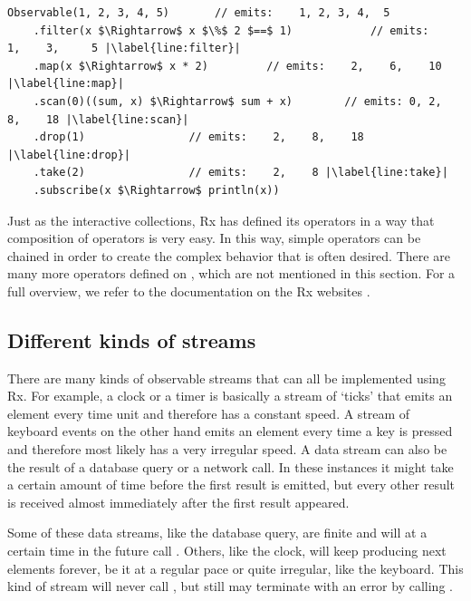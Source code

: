 \begin{minipage}{\linewidth}
\begin{lstlisting}[style=ScalaStyle, caption={Operators on \obs}, label={lst:operators-obs}, columns=fixed]
Observable(1, 2, 3, 4, 5)		// emits:    1, 2, 3, 4,  5
    .filter(x $\Rightarrow$ x $\%$ 2 $==$ 1)			// emits:    1,    3,     5 |\label{line:filter}|
    .map(x $\Rightarrow$ x * 2)			// emits:    2,    6,    10 |\label{line:map}|
    .scan(0)((sum, x) $\Rightarrow$ sum + x)		// emits: 0, 2,    8,    18 |\label{line:scan}|
    .drop(1)				// emits:    2,    8,    18 |\label{line:drop}|
    .take(2)				// emits:    2,    8 |\label{line:take}|
    .subscribe(x $\Rightarrow$ println(x))
\end{lstlisting}
\end{minipage}

Just as the interactive collections, Rx has defined its operators in a way that composition of operators is very easy. In this way, simple operators can be chained in order to create the complex behavior that is often desired. There are many more operators defined on \obs, which are not mentioned in this section. For a full overview, we refer to the documentation on the Rx websites \cite{ReactiveX, rx-api, Rx.Net}.

\subsection{Different kinds of streams}
\label{subsec:stream-kinds}
There are many kinds of observable streams that can all be implemented using Rx. For example, a clock or a timer is basically a stream of `ticks' that emits an element every time unit and therefore has a constant speed. A stream of keyboard events on the other hand emits an element every time a key is pressed and therefore most likely has a very irregular speed. A data stream can also be the result of a database query or a network call. In these instances it might take a certain amount of time before the first result is emitted, but every other result is received almost immediately after the first result appeared.

Some of these data streams, like the database query, are finite and will at a certain time in the future call . Others, like the clock, will keep producing next elements forever, be it at a regular pace or quite irregular, like the keyboard. This kind of stream will never call , but still may terminate with an error by calling .

